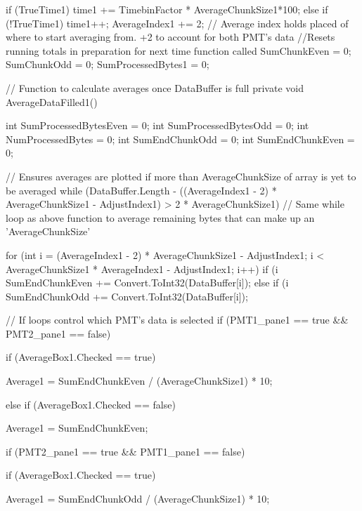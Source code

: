 {{{{                if (TrueTime1)
                {
                    time1 += TimebinFactor * AverageChunkSize1*100;
                }
                else if (!TrueTime1)
                {
                    time1++;
                }
                AverageIndex1 += 2; // Average index holds placed of where to start averaging from. +2 to account for both PMT's data
                //Resets running totals in preparation for next time function called
                SumChunkEven = 0;
                SumChunkOdd = 0;
                SumProcessedBytes1 = 0;
            }

        }

        // Function to calculate averages once DataBuffer is full
        private void AverageDataFilled1()
        {
            int SumProcessedBytesEven = 0;
            int SumProcessedBytesOdd = 0;
            int NumProcessedBytes = 0;
            int SumEndChunkOdd = 0;
            int SumEndChunkEven = 0;

            // Ensures averages are plotted if more than AverageChunkSize of array is yet to be averaged
            while (DataBuffer.Length - ((AverageIndex1 - 2) * AverageChunkSize1 - AdjustIndex1) > 2 * AverageChunkSize1) // Same while loop as above function to average remaining bytes that can make up an 'AverageChunkSize'
            {

                for (int i = (AverageIndex1 - 2) * AverageChunkSize1 - AdjustIndex1; i < AverageChunkSize1 * AverageIndex1 - AdjustIndex1; i++)
                {
                    if (i %
                    {
                        SumEndChunkEven += Convert.ToInt32(DataBuffer[i]);
                    }
                    else if (i %
                    {
                        SumEndChunkOdd += Convert.ToInt32(DataBuffer[i]);
                    }
                }

                // If loops control which PMT's data is selected
                if (PMT1_pane1 == true && PMT2_pane1 == false)
                {
                    if (AverageBox1.Checked == true)
                    {
                        Average1 = SumEndChunkEven / (AverageChunkSize1) * 10;

                    }
                    else if (AverageBox1.Checked == false)
                    {
                        Average1 = SumEndChunkEven;

                    }
                }
                if (PMT2_pane1 == true && PMT1_pane1 == false)
                {
                    if (AverageBox1.Checked == true)
                    {
                        Average1 = SumEndChunkOdd / (AverageChunkSize1) * 10;

}}}}}}
